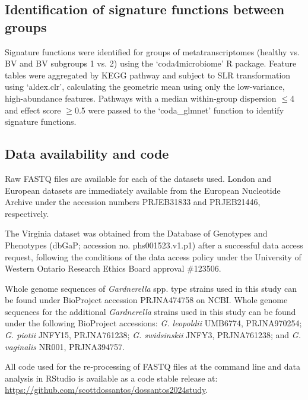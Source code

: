 \documentclass[sn-mathphys,Numbered]{sn-jnl}%
\begin{document}
\subsection{Identification of signature functions between groups} \label{subsec:subsecCoda4Micro}
Signature functions were identified for groups of metatranscriptomes (healthy vs. BV and BV subgroups 1 vs. 2) using the `coda4microbiome' R package. Feature tables were aggregated by KEGG pathway and subject to SLR transformation using `aldex.clr', calculating the geometric mean using only the low-variance, high-abundance features. Pathways with a median within-group dispersion $\leq$4 and effect score $\geq$0.5 were passed to the `coda\_glmnet' function to identify signature functions.

\subsection{Data availability and code}\label{subsec:subsecDataAvail}
Raw FASTQ files are available for each of the datasets used. London and European datasets are immediately available from the European Nucleotide Archive under the accession numbers PRJEB31833 and PRJEB21446, respectively.

The Virginia dataset was obtained from the Database of Genotypes and Phenotypes (dbGaP; accession no. phs001523.v1.p1) after a successful data access request, following the conditions of the data access policy under the University of Western Ontario Research Ethics Board approval \#123506.

Whole genome sequences of \textit{Gardnerella} spp. type strains used in this study can be found under BioProject accession PRJNA474758 on NCBI. Whole genome sequences for the additional \textit{Gardnerella} strains used in this study can be found under the following BioProject accessions: \textit{G. leopoldii} UMB6774, PRJNA970254; \textit{G. piotii} JNFY15, PRJNA761238; \textit{G. swidsinskii} JNFY3, PRJNA761238; and \textit{G. vaginalis} NR001, PRJNA394757.

All code used for the re-processing of FASTQ files at the command line and data analysis in RStudio is available as a code stable release at: \url{https://github.com/scottdossantos/dossantos2024study}.
\end{document}
